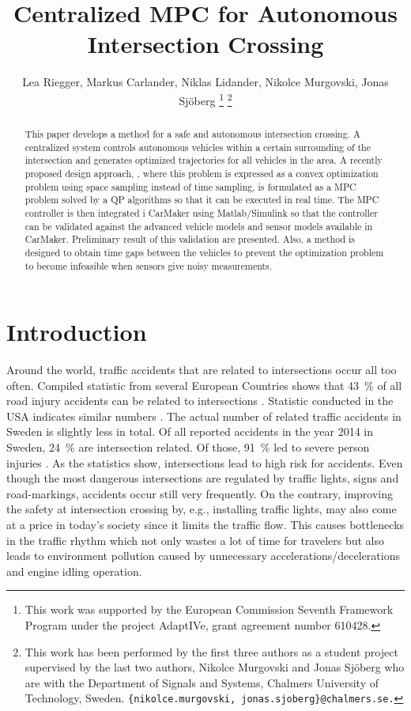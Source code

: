 \documentclass[letterpaper,10pt,conference]{ieeeconf}
\author{Lea Riegger, Markus Carlander, Niklas Lidander, Nikolce Murgovski, Jonas Sj\"oberg
\thanks{This work was supported by the European Commission Seventh Framework
Program under the project AdaptIVe, grant agreement number 610428.}
\thanks{This work has been performed by the first three authors as a
  student project supervised by the last two authors, Nikolce Murgovski
  and Jonas Sj\"oberg who are with the Department of Signals and Systems, Chalmers University of Technology, Sweden. {\tt \{nikolce.murgovski, jonas.sjoberg\}@chalmers.se.}}}%
\begin{document}

\title{Centralized MPC for Autonomous Intersection Crossing}

\maketitle
\thispagestyle{empty}
\pagestyle{empty}

\begin{abstract}
This paper develops a method for a safe and autonomous intersection
crossing. A centralized system controls autonomous vehicles within a
certain surrounding of the intersection and generates optimized
trajectories for all vehicles in the area. A recently proposed design
approach, \cite{nikolce},
where this problem is expressed as a convex optimization problem using
space sampling instead of time sampling, is formulated as a MPC
problem solved by a QP algorithms so that it can be executed in real time.
The MPC controller is then integrated i CarMaker using
Matlab/Simulink so that the controller can be validated against the
advanced vehicle models and sensor models available in
CarMaker. Preliminary result of this validation are presented. Also, a
method is designed to obtain time gaps between the vehicles to prevent the
optimization problem to become infeasible when sensors give noisy measurements.
\end{abstract}

\IEEEpeerreviewmaketitle

\section{Introduction}%

Around the world, traffic accidents that are related to intersections occur all too often. Compiled statistic from several European Countries shows that \SI{43}{\%} of all road injury accidents can be related to intersections \cite{molinero}. Statistic conducted in the USA indicates similar numbers \cite{nhtsa}. The actual number of related traffic accidents in Sweden is slightly less in total. Of all reported accidents in the year 2014 in Sweden, \SI{24}{\%} are intersection related. Of those, \SI{91}{\%} led to severe person injuries \cite{sverige}. As the statistics show, intersections lead to high risk for accidents. Even though the most dangerous intersections are regulated by traffic lights, signs and road-markings, accidents occur still very frequently. On the contrary, improving the safety at intersection crossing by, e.g., installing traffic lights, may also come at a price in today's society since it limits the traffic flow. This causes bottlenecks in the traffic rhythm which not only wastes a lot of time for travelers but also leads to environment pollution caused by unnecessary accelerations/decelerations and engine idling operation.
\end{document}
